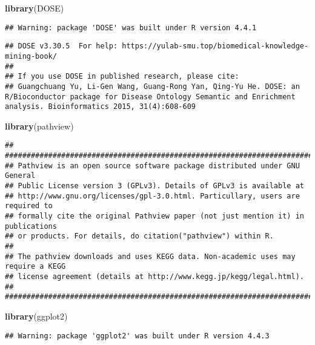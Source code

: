 \documentclass[
]{article}
\newenvironment{Shaded}{\begin{snugshade}}{\end{snugshade}}
\newcommand{\FunctionTok}[1]{\textcolor[rgb]{0.13,0.29,0.53}{\textbf{#1}}}
\newcommand{\NormalTok}[1]{#1}
\begin{document}
\begin{Shaded}
\begin{Highlighting}[]
\FunctionTok{library}\NormalTok{(DOSE)}
\end{Highlighting}
\end{Shaded}

\begin{verbatim}
## Warning: package 'DOSE' was built under R version 4.4.1
\end{verbatim}

\begin{verbatim}
## DOSE v3.30.5  For help: https://yulab-smu.top/biomedical-knowledge-mining-book/
## 
## If you use DOSE in published research, please cite:
## Guangchuang Yu, Li-Gen Wang, Guang-Rong Yan, Qing-Yu He. DOSE: an R/Bioconductor package for Disease Ontology Semantic and Enrichment analysis. Bioinformatics 2015, 31(4):608-609
\end{verbatim}

\begin{Shaded}
\begin{Highlighting}[]
\FunctionTok{library}\NormalTok{(pathview)}
\end{Highlighting}
\end{Shaded}

\begin{verbatim}
## ##############################################################################
## Pathview is an open source software package distributed under GNU General
## Public License version 3 (GPLv3). Details of GPLv3 is available at
## http://www.gnu.org/licenses/gpl-3.0.html. Particullary, users are required to
## formally cite the original Pathview paper (not just mention it) in publications
## or products. For details, do citation("pathview") within R.
## 
## The pathview downloads and uses KEGG data. Non-academic uses may require a KEGG
## license agreement (details at http://www.kegg.jp/kegg/legal.html).
## ##############################################################################
\end{verbatim}

\begin{Shaded}
\begin{Highlighting}[]
\FunctionTok{library}\NormalTok{(ggplot2)}
\end{Highlighting}
\end{Shaded}

\begin{verbatim}
## Warning: package 'ggplot2' was built under R version 4.4.3
\end{verbatim}
\end{document}
